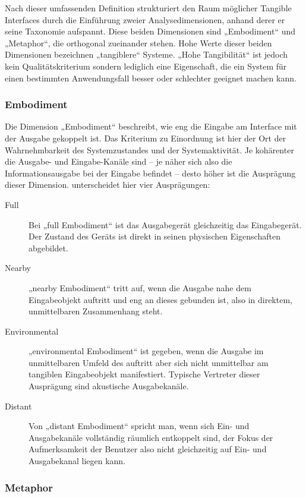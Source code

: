 Nach dieser umfassenden Definition strukturiert \citeauthor{Fishkin04} den Raum möglicher Tangible Interfaces durch die Einführung zweier Analysedimensionen, anhand derer er seine  Taxonomie aufspannt. Diese beiden Dimensionen sind „Embodiment“ und „Metaphor“, die orthogonal zueinander stehen. Hohe Werte dieser beiden Dimensionen bezeichnen „tangiblere“ Systeme. „Hohe Tangibilität“ ist jedoch kein Qualitätskriterium sondern lediglich eine Eigenschaft, die ein System für einen bestimmten Anwendungsfall besser oder schlechter geeignet machen kann.

\subsubsection{Embodiment}
Die Dimension „Embodiment“ beschreibt, wie eng die Eingabe am Interface mit der Ausgabe gekoppelt ist. Das Kriterium zu Einordnung ist hier der Ort der Wahrnehmbarkeit des Systemzustandes und der Systemaktivität. Je kohärenter die Ausgabe- und Eingabe-Kanäle sind -- je näher sich also die Informationsausgabe bei der Eingabe befindet -- desto höher ist die Ausprägung dieser Dimension. \citeauthor{Fishkin04} unterscheidet hier vier Ausprägungen:
\begin{description}
 \item[Full] Bei „full Embodiment“ ist das Ausgabegerät gleichzeitig das Eingabegerät. Der Zustand des Geräts ist direkt in seinen physischen Eigenschaften abgebildet.
 \item[Nearby] „nearby Embodiment“ tritt auf, wenn die Ausgabe nahe dem Eingabeobjekt auftritt und eng an dieses gebunden ist, also in direktem, unmittelbaren Zusammenhang steht. 
 \item[Environmental] „environmental Embodiment“ ist gegeben, wenn die Ausgabe im unmittelbaren Umfeld des auftritt aber sich nicht unmittelbar am tangiblen Eingabeobjekt manifestiert. Typische Vertreter dieser Ausprägung sind akustische Ausgabekanäle.
 \item[Distant] Von „distant Embodiment“ spricht man, wenn sich Ein- und Ausgabekanäle vollständig räumlich entkoppelt sind, der Fokus der Aufmerksamkeit der Benutzer also nicht gleichzeitig auf Ein- und Ausgabekanal liegen kann. 
\end{description}

\subsubsection{Metaphor}

